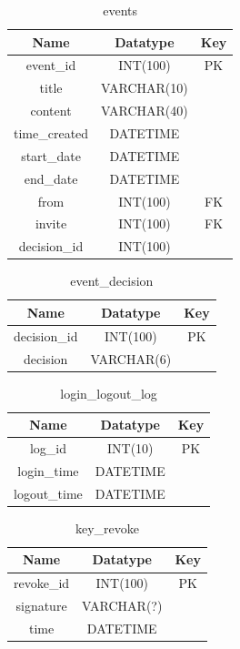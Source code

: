 \begin{table}[!ht]
\caption{events}
\centering
\begin{tabular}{c c c}
\hline\hline
Name                    & Datatype    & Key \\
\hline
event\_id               & INT(100)     & PK  \\
title                   & VARCHAR(10)  &     \\
content                 & VARCHAR(40)  &     \\
time\_created           & DATETIME     & \\
start\_date              & DATETIME     & \\
end\_date                & DATETIME     & \\
from                    & INT(100)     & FK  \\
invite                  & INT(100)     & FK  \\
decision\_id            & INT(100)     & \\
\hline
\end{tabular}
\label{table:nonlin}
\end{table}

\begin{table}[!ht]
\caption{event\_decision}
\centering
\begin{tabular}{c c c}
\hline\hline
Name                    & Datatype    & Key \\
\hline
decision\_id            & INT(100)    & PK  \\
decision                & VARCHAR(6)  &     \\
\hline
\end{tabular}
\label{table:nonlin}
\end{table}

\begin{table}[!ht]
\caption{login\_logout\_log}
\centering
\begin{tabular}{c c c}
\hline\hline
Name               & Datatype    & Key \\
\hline
log\_id            & INT(10)     & PK  \\
login\_time        & DATETIME    &     \\
logout\_time       & DATETIME    &     \\
\hline
\end{tabular}
\label{table:nonlin}
\end{table}

\begin{table}[!ht]
\caption{key\_revoke}
\centering
\begin{tabular}{c c c}
\hline\hline
Name               & Datatype    & Key \\
\hline
revoke\_id         & INT(100)     & PK  \\
signature          & VARCHAR(?)   &     \\
time               & DATETIME     &     \\
\hline
\end{tabular}
\label{table:nonlin}
\end{table}

